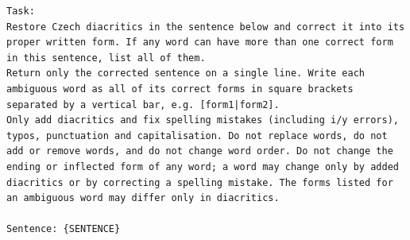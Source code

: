 \documentclass[11pt,a4paper]{article}
\begin{document}
\begin{lstlisting}[style=prompt,caption={Výchozí prompt},label={lst:prompt-vychozi}]
Task:
Restore Czech diacritics in the sentence below and correct it into its proper written form. If any word can have more than one correct form in this sentence, list all of them.
Return only the corrected sentence on a single line. Write each ambiguous word as all of its correct forms in square brackets separated by a vertical bar, e.g. [form1|form2].
Only add diacritics and fix spelling mistakes (including i/y errors), typos, punctuation and capitalisation. Do not replace words, do not add or remove words, and do not change word order. Do not change the ending or inflected form of any word; a word may change only by added diacritics or by correcting a spelling mistake. The forms listed for an ambiguous word may differ only in diacritics.

Sentence: {SENTENCE}
\end{lstlisting}
\end{document}

